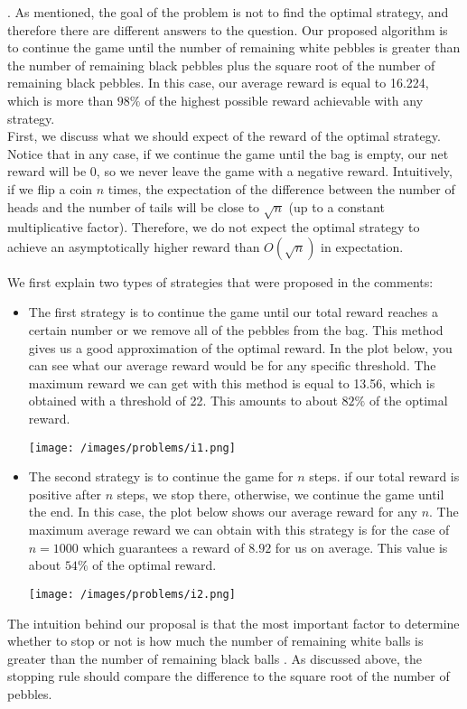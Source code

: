 \begin{solution}.
As mentioned, the goal of the problem is not to find the optimal strategy, and therefore there are different answers to the question. Our proposed algorithm is to continue the game until the number of remaining white pebbles is greater than the number of remaining black pebbles plus the square root of the number of remaining black pebbles. In this case, our average reward is equal to 16.224, which is more than $98\%$ of the highest possible reward achievable with any strategy.\\[0.2cm]

First, we discuss what we should expect of the reward of the optimal strategy. Notice that in any case, if we continue the game until the bag is empty, our net reward will be 0, so we never leave the game with a negative reward. Intuitively, if we flip a coin $n$ times, the expectation of the difference between the number of heads and the number of tails will be close to $\sqrt{n}$ (up to a constant multiplicative factor). Therefore, we do not expect the optimal strategy to  achieve an asymptotically higher reward than $O(\sqrt{n})$ in expectation. 


We first explain two types of strategies that were proposed in the comments:

\begin{itemize}
\item The first strategy is to continue the game until our total reward reaches a certain number or we remove all of the pebbles from the bag. This method gives us a good approximation of the optimal reward. In the plot below, you can see what our average reward would be for any specific threshold. The maximum reward we can get with this method is equal to 13.56, which is obtained with a threshold of 22. This amounts to about $82\%$ of the optimal reward.

\begin{center}
	\texttt{[image: /images/problems/i1.png]}
\end{center}

\item The second strategy is to continue the game for $n$ steps. if our total reward is positive after $n$ steps, we stop there, otherwise, we continue the game until the end. In this case, the plot below shows our average reward for any $n$. The maximum average reward we can obtain with this strategy is for the case of $n=1000$ which guarantees a reward of $8.92$ for us on average. This value is about $54\%$ of the optimal reward.

\begin{center}
	\texttt{[image: /images/problems/i2.png]}
\end{center}
\end{itemize}


The intuition behind our proposal is that the most important factor to determine whether to stop or not is how much the number of remaining white balls  is greater than the number of remaining black balls . As discussed above, the stopping rule should compare the difference to the square root of the number of pebbles.

\end{solution}